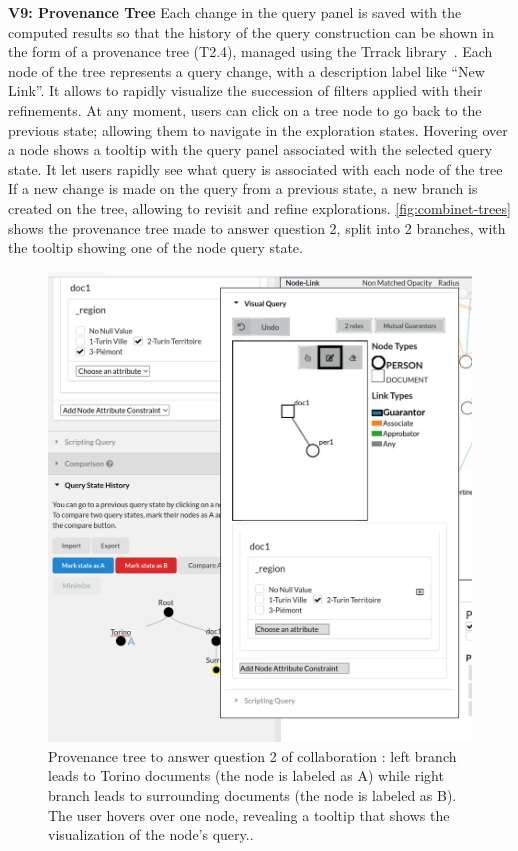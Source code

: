 \noindent\textbf{V9: Provenance Tree}
Each change in the query panel is saved with the computed results so that the history of the query construction can be shown in the form of a provenance tree (T2.4), managed using the Trrack library~\cite{cutlerTrrackLibraryProvenanceTracking2020}.
Each node of the tree represents a query change, with a description label like ``New Link''.
It allows to rapidly visualize the succession of filters applied with their refinements.
At any moment, users can click on a tree node to go back to the previous state; allowing them to navigate in the exploration states.
Hovering over a node shows a tooltip with the query panel associated with the selected query state.
It let users rapidly see what query is associated with each node of the tree
If a new change is made on the query from a previous state, a new branch is created on the tree, allowing to revisit and refine explorations.  \autoref{fig:combinet-trees} shows the provenance tree made to answer question 2, split into 2 branches, with the tooltip showing one of the node query state.

\begin{figure}[!ht]
     \centering
     \includegraphics[width=0.5\linewidth]{static/figures/ComBiNet/tree_tooltip_torinoquery_crop}
     \caption{Provenance tree to answer question 2 of collaboration \pascal: left branch leads to Torino documents (the node is labeled as A) while right branch leads to surrounding documents (the node is labeled as B). The user hovers over one node, revealing a tooltip that shows the visualization of the node's query..}\label{fig:combinet-trees}
 \end{figure}


